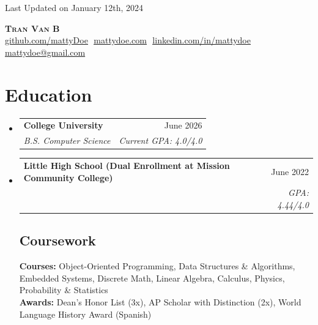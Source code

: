 \documentclass[letterpaper,11pt]{article}
\makeatletter
\newcommand{\resumeSubheading}[4]{
  \vspace{-2pt}\item
    \begin{tabular*}{0.97\textwidth}[t]{l@{\extracolsep{\fill}}r}
      \textbf{#1} & #2 \\
      \textit{\small#3} & \textit{\small #4} \\
    \end{tabular*}\vspace{-7pt}
}
\newcommand{\resumeSubHeadingListStart}{\begin{itemize}[leftmargin=0.15in, label={}]}
\newcommand{\resumeSubHeadingListEnd}{\end{itemize}}
\makeatother
\begin{document}
\begin{flushright}
  \color{gray}
  \item
  Last Updated on January 12th, 2024
\end{flushright}

\vspace{-5pt}

\begin{center}
    \textbf{\Huge \scshape Tran Van B} \\ \vspace{8pt}
    \small 
    \href{https://github.com/mattyDoe}{\underline{github.com/mattyDoe}} $  $
    \href{https://www.mattydoe.com}
    {\underline{mattydoe.com}} $  $
    \href{https://linkedin.com/in/mattydoe}{\underline{linkedin.com/in/mattydoe}} $  $
    \href{mailto:mattydoe@gmail.com}
    {\underline{mattydoe@gmail.com}}
\end{center}

\section{Education}
  \resumeSubHeadingListStart
  
    \resumeSubheading
      {College University}{June 2026}
      {B.S. Computer Science}{Current GPA: 4.0/4.0}
      
    \resumeSubheading
      {Little High School \footnotesize{(Dual Enrollment at Mission Community College)}}{June 2022}
      {}{GPA: 4.44/4.0}

    \vspace{-10pt}

    \subsection{Coursework}
      \textbf{Courses:} Object-Oriented Programming, Data Structures \& Algorithms, Embedded Systems, Discrete Math, Linear Algebra, Calculus, Physics, Probability \& Statistics \\
      \textbf{Awards:} Dean's Honor List (3x), AP Scholar with Distinction (2x), World Language History Award (Spanish)

  \resumeSubHeadingListEnd

\end{document}
